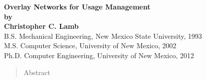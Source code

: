 \documentclass[12pt,letterpaper]{article}
\begin{document}

\begin{center}
\textbf{Overlay Networks for Usage Management} \\
\vspace{5mm}
\textbf{by} \\
\vspace{5mm}
\textbf{Christopher C. Lamb} \\
\vspace{2mm}
B.S. Mechanical Engineering, New Mexico State University, 1993 \\
M.S. Computer Science, University of New Mexico, 2002 \\
Ph.D. Computer Engineering, University of New Mexico, 2012 \\
\end{center}

\doublespacing

\begin{abstract}
Abstract
\end{abstract}

\pagebreak
\tableofcontents
\pagebreak
\listoffigures
\pagebreak
\listoftables
\pagebreak





\end{document}
